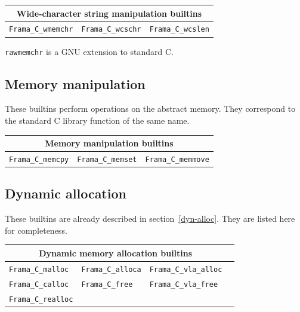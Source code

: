 \documentclass{frama-c-book}
\begin{document}
\begin{table}[!ht]
  \centering
  \begin{tabular}{ccc}
    \multicolumn{3}{c}{Wide-character string manipulation builtins} \\
    \hline
    \lstinline|Frama_C_wmemchr| &
    \lstinline|Frama_C_wcschr| &
    \lstinline|Frama_C_wcslen|
  \end{tabular}
\end{table}

\begin{important}
  \lstinline|rawmemchr| is a GNU extension to standard C.
\end{important}

\subsection{Memory manipulation}
These builtins perform operations on the abstract memory.
They correspond to the standard C library function of the same name.

\begin{table}[!ht]
  \centering
  \begin{tabular}{ccc}
    \multicolumn{3}{c}{Memory manipulation builtins} \\
    \hline
    \lstinline|Frama_C_memcpy| &
    \lstinline|Frama_C_memset| &
    \lstinline|Frama_C_memmove|
  \end{tabular}
\end{table}

\subsection{Dynamic allocation}

These builtins are already described in section~\ref{dyn-alloc}.
They are listed here for completeness.

\begin{table}[!ht]
  \centering
  \begin{tabular}{llll}
    \multicolumn{3}{c}{Dynamic memory allocation builtins} \\
    \hline
    \lstinline|Frama_C_malloc| &
    \lstinline|Frama_C_alloca| &
    \lstinline|Frama_C_vla_alloc| \\
    \lstinline|Frama_C_calloc| &
    \lstinline|Frama_C_free| &
    \lstinline|Frama_C_vla_free| \\
    \lstinline|Frama_C_realloc|
  \end{tabular}
\end{table}
\end{document}
